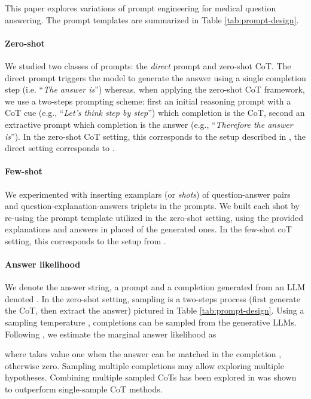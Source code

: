 \documentclass{article} \usepackage{iclr2022_conference,times}
\newcommand{\PromptOne}{\textit{Let's think step by step}}
\begin{document}
This paper explores variations of prompt engineering for medical question answering. The prompt templates are summarized in Table \ref{tab:prompt-design}.



\paragraph{Zero-shot} We studied two classes of prompts: the \textit{direct} prompt and zero-shot CoT. The direct prompt triggers the model to generate the answer using a single completion step (i.e. ``\textit{The answer is}'') whereas, when applying the zero-shot CoT framework, we use a two-steps prompting scheme: first an initial reasoning prompt with a CoT cue (e.g., ``\PromptOne'') which completion is the CoT, second an extractive prompt which completion is the answer (e.g., ``\textit{Therefore the answer is}''). In the zero-shot CoT setting, this corresponds to the setup described in \cite{Kojima2022-wg}, the direct setting corresponds to \cite{Brown2020-ad}.

\paragraph{Few-shot}

We experimented with inserting examplars (or \textit{shots}) of question-answer pairs and question-explanation-answers triplets in the prompts. We built each shot by re-using the prompt template utilized in the zero-shot setting, using the provided explanations and answers in placed of the generated ones. In the few-shot coT setting, this corresponds to the setup from \cite{Wei2022-tw}.

\paragraph{Answer likelihood}

We denote  the answer string,  a prompt and  a completion generated from an LLM denoted . In the zero-shot setting, sampling  is a two-steps process (first generate the CoT, then extract the answer) pictured in Table \ref{tab:prompt-design}. Using a sampling temperature ,  completions  can be sampled from the generative LLMs. Following \cite{Wang2022-jx}, we estimate the marginal answer likelihood as

where  takes value one when the answer  can be matched in the completion , otherwise zero. Sampling multiple completions may allow exploring multiple hypotheses. Combining multiple sampled CoTs has been explored in \cite{Wang2022-jx, Li2022-sl} 
 was shown to outperform single-sample CoT methods.
\end{document}
